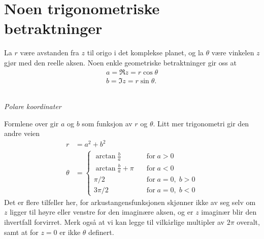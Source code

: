 \section*{Noen trigonometriske betraktninger}
La $r$ være avstanden fra $z$ til origo i det komplekse planet, 
og la $\theta$ være vinkelen $z$ gjør med den reelle aksen. 
Noen enkle geometriske betraktninger gir oss at 
\begin{align*}
a=\Re z = r\cos \theta \\
b=\Im z = r\sin \theta.
\end{align*}
\begin{center}
\\
{\small \textit{Polare koordinater}}
\end{center}
Formlene over gir $a$ og $b$ som funksjon av $r$ og $\theta$. 
Litt mer trigonometri gir den andre veien
\begin{align*}
r&=a^2+b^2 \\
\theta&= \begin{cases} \arctan \frac{b}{a} \quad &\text{for}\; a>0\\ \arctan \frac{b}{a} + \pi \quad &\text{for}\;  a<0 \\  \pi/2 \quad &\text{for}\;  a=0, \; b>0 \\ 3\pi/2 \quad &\text{for}\;  a=0, \; b<0  \end{cases}
\end{align*}
Det er flere tilfeller her, for arkustangensfunksjonen skjønner ikke av seg selv om 
$z$ ligger til høyre eller venstre for den imaginære aksen, 
og er $z$ imaginær blir den ihvertfall forvirret.
 Merk også at vi kan legge til vilkårlige multipler av $2\pi$ overalt, samt at for $z=0$ er ikke $\theta$ definert.
 
